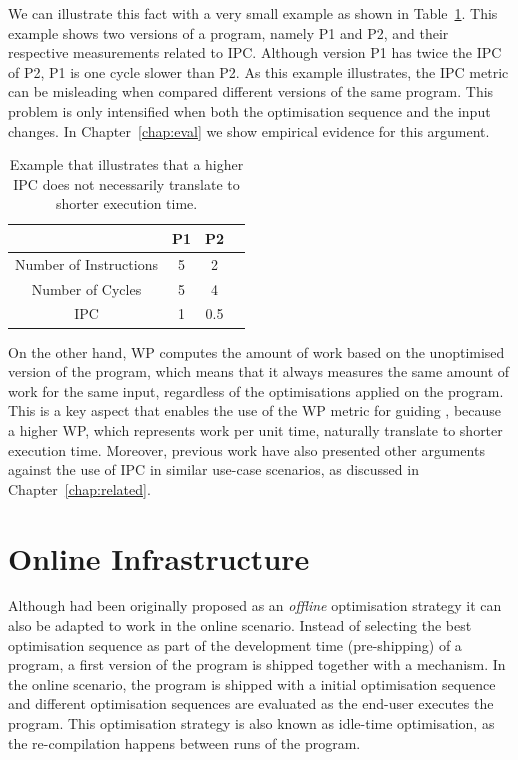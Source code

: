 We can illustrate this fact with a very small example as shown in Table~\ref{tab:ipc-example}.
This example shows two versions of a program, namely P1 and P2, and their respective measurements related to IPC.
Although version P1 has twice the IPC of P2, P1 is one cycle slower than P2.
As this example illustrates, the IPC metric can be misleading when compared different versions of the same program.
This problem is only intensified when both the optimisation sequence and the input changes.
In Chapter~\ref{chap:eval} we show empirical evidence for this argument.

\begin{table}[h]
\centering
\begin{tabular}{|c|c|c|c|}
\hline
                       & P1 & P2  \\
\hline
Number of Instructions & 5  & 2   \\
Number of Cycles       & 5  & 4   \\
IPC                    & 1  & 0.5 \\
\hline
\end{tabular}
\caption{Example that illustrates that a higher IPC does not necessarily translate to shorter execution time.}
\label{tab:ipc-example}
\end{table}

On the other hand, WP computes the amount of work based on the unoptimised version of the program, which means that it always measures the same amount of work for the same input, regardless of the optimisations applied on the program.
This is a key aspect that enables the use of the WP metric for guiding {\itercomp}, because a higher WP, which represents work per unit time, naturally translate to shorter execution time.
Moreover, previous work have also presented other arguments against the use of IPC in similar use-case scenarios, as discussed in Chapter~\ref{chap:related}.
  
\section{Online {\IterComp} Infrastructure} \label{sec:oic-infra}

Although {\itercomp} had been originally proposed as an \textit{offline} optimisation strategy it can also be adapted to work in the online scenario.
Instead of selecting the best optimisation sequence as part of the development time (pre-shipping) of a program, a first version of the program is shipped together with a {\itercomp} mechanism.
In the online scenario, the program is shipped with a initial optimisation sequence and different optimisation sequences are evaluated as the end-user executes the program.
This optimisation strategy is also known as idle-time optimisation, as the re-compilation happens between runs of the program.

